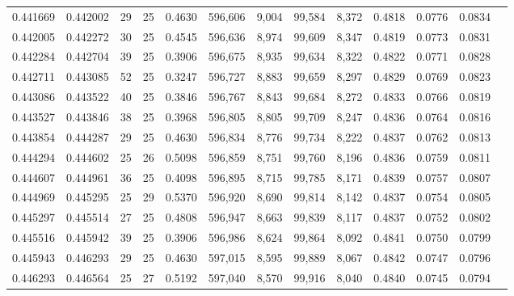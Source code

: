 \begin{tabular}{rrrrrrrrrrrrr}
0.441669 & 0.442002 &    29 &  25 &                                     0.4630 & 596,606 &   9,004 &  99,584 &   8,372 & 0.4818 & 0.0776 & 0.0834 \\
0.442005 & 0.442272 &    30 &  25 &                                     0.4545 & 596,636 &   8,974 &  99,609 &   8,347 & 0.4819 & 0.0773 & 0.0831 \\
0.442284 & 0.442704 &    39 &  25 &                                     0.3906 & 596,675 &   8,935 &  99,634 &   8,322 & 0.4822 & 0.0771 & 0.0828 \\
0.442711 & 0.443085 &    52 &  25 &                                     0.3247 & 596,727 &   8,883 &  99,659 &   8,297 & 0.4829 & 0.0769 & 0.0823 \\
0.443086 & 0.443522 &    40 &  25 &                                     0.3846 & 596,767 &   8,843 &  99,684 &   8,272 & 0.4833 & 0.0766 & 0.0819 \\
0.443527 & 0.443846 &    38 &  25 &                                     0.3968 & 596,805 &   8,805 &  99,709 &   8,247 & 0.4836 & 0.0764 & 0.0816 \\
0.443854 & 0.444287 &    29 &  25 &                                     0.4630 & 596,834 &   8,776 &  99,734 &   8,222 & 0.4837 & 0.0762 & 0.0813 \\
0.444294 & 0.444602 &    25 &  26 &                                     0.5098 & 596,859 &   8,751 &  99,760 &   8,196 & 0.4836 & 0.0759 & 0.0811 \\
0.444607 & 0.444961 &    36 &  25 &                                     0.4098 & 596,895 &   8,715 &  99,785 &   8,171 & 0.4839 & 0.0757 & 0.0807 \\
0.444969 & 0.445295 &    25 &  29 &                                     0.5370 & 596,920 &   8,690 &  99,814 &   8,142 & 0.4837 & 0.0754 & 0.0805 \\
0.445297 & 0.445514 &    27 &  25 &                                     0.4808 & 596,947 &   8,663 &  99,839 &   8,117 & 0.4837 & 0.0752 & 0.0802 \\
0.445516 & 0.445942 &    39 &  25 &                                     0.3906 & 596,986 &   8,624 &  99,864 &   8,092 & 0.4841 & 0.0750 & 0.0799 \\
0.445943 & 0.446293 &    29 &  25 &                                     0.4630 & 597,015 &   8,595 &  99,889 &   8,067 & 0.4842 & 0.0747 & 0.0796 \\
0.446293 & 0.446564 &    25 &  27 &                                     0.5192 & 597,040 &   8,570 &  99,916 &   8,040 & 0.4840 & 0.0745 & 0.0794 \\

\end{tabular}
